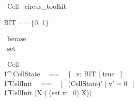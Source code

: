 \begin{zsection}
	\SECTION\ Cell \parents\ circus\_toolkit
\end{zsection}

\begin{zed}
	BIT == \{0, 1\} \\      %
\end{zed}

\begin{circus}
	\circchannel\ berase\\
	\circchannel\ set\\
\end{circus}

\begin{circus}
	\circprocess\ Cell \circdef \circbegin \\
		\t1 \circstate\ CellState ~~==~~ [~ v: BIT | true ~] \\
    	\t1	CellInit ~~==~~ [~ (CellState)' | v' = 0 ~] \\
	    \t1 \circspot \lschexpract CellInit \rschexpract \circseq (\circmu X \circspot ( (set \then v:=0) \circseq X)) \\
	\circend
\end{circus}

